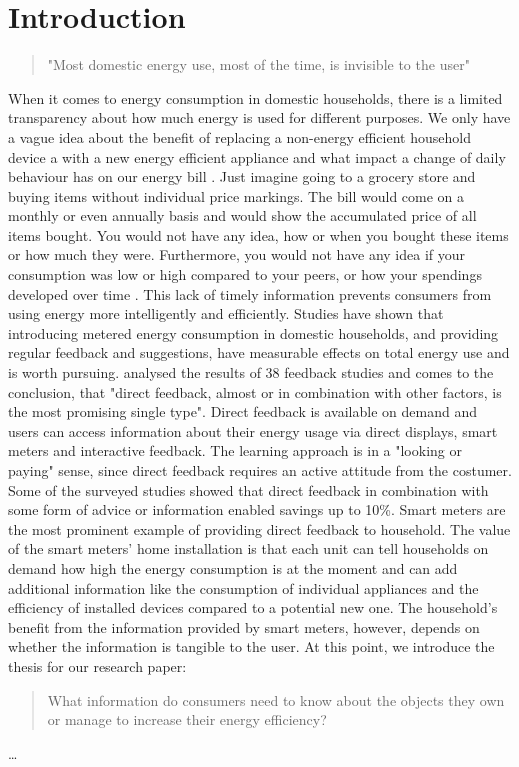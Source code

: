 
\chapter{Introduction}
\label{ch:Introduction}

\begin{quotation}
"Most domestic energy use, most of the time, is invisible to the user" 
\begin{flushright}
\cite{Darby2006}
\end{flushright}
\end{quotation}

When it comes to energy consumption in domestic households, there is a limited transparency about how much energy is used for different purposes. We only have a vague idea about the benefit of replacing a non-energy efficient household device a with a new energy efficient appliance and what impact a change of daily behaviour has on our energy bill  \citep{Darby2006}.
Just imagine going to a grocery store and buying items without individual price markings. The bill would come on a monthly or even annually basis and would show the accumulated price of all items bought. You would not have any idea, how or when you bought these items or how much they were. Furthermore, you would not have any idea if your consumption was low or high compared to your peers, or how your spendings developed over time  \citep{Kempton1994}.
This lack of timely information prevents  consumers from using energy more intelligently and efficiently\citep{Darby2000}.
Studies have shown that introducing metered energy consumption in domestic households, and providing regular feedback and suggestions, have measurable effects on total energy use and is worth pursuing.  
 \cite{Darby2000} analysed the results of 38 feedback studies and comes to the conclusion, that "direct feedback, almost or in combination with other factors, is the most promising single type". Direct feedback is available on demand and users can access information about their energy usage via direct displays, smart meters and interactive feedback. The learning approach is in a "looking or paying" sense, since direct feedback requires an active attitude from the costumer.
Some of the surveyed studies showed that direct feedback in combination with some form of advice or information enabled savings up to 10\%.
Smart meters are the most prominent example of providing direct feedback to household. The value of the smart meters' home installation is that each unit can tell households on demand how high the energy consumption is at the moment and can add additional information like the consumption of individual appliances and the efficiency of installed devices compared to a potential new one. The household's benefit from the information provided by smart meters, however, depends on whether the information is tangible to the user.
At this point, we introduce the thesis for our research paper:
\begin{quotation}
What information do consumers need to know about the objects they own or manage to increase their energy efficiency? 
\end{quotation}

\dots